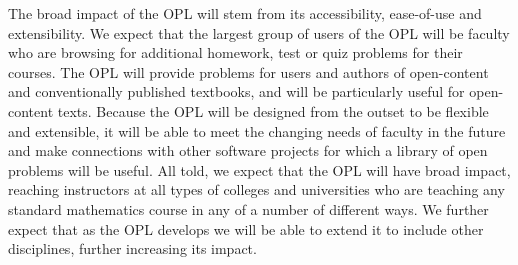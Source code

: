 \documentclass[11pt]{article}
\begin{document}
The broad impact of the OPL will stem from its accessibility, ease-of-use
and extensibility.  We expect that the largest group of users of the OPL
will be faculty who are browsing for additional homework, test or quiz
problems for their courses.  The OPL will provide problems for users and
authors of open-content and conventionally published textbooks, and will
be particularly useful for open-content texts.  Because the OPL will be
designed from the outset to be flexible and extensible, it will be able to
meet the changing needs of faculty in the future and make connections with
other software projects for which a library of open problems will be
useful.  All told, we expect that the OPL will have broad impact, reaching
instructors at all types of colleges and universities who are teaching any
standard mathematics course in any of a number of different ways.  We
further expect that as the OPL develops we will be able to extend it to
include other disciplines, further increasing its impact.
\end{document}
